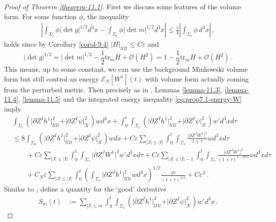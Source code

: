 \documentclass[11pt, a4paper]{amsart}
\numberwithin{equation}{section}
\numberwithin{theorem}{section}
\newcommand{\p}{\partial}
\newcommand{\pgood}{\overline{\partial}}
\newcommand{\tr}{\text{tr}}
\newcommand{\UU}{{\mathcal{U} \mathcal{U}}}
\newcommand{\K}{\mathcal{K}}
\newcommand{\I}{\vert I \vert}
\newcommand{\J}{\vert J \vert}
\begin{document}
\begin{proof}[Proof of Theorem \ref{theorem-11.1}]
First we discuss some features of the volume form. For some function $\phi$, the inequality
\begin{align*}
 \left\vert \int_{\Sigma_t} \phi \vert \det g \vert^{1/2} d^3 x -  \int_{\Sigma_t} \phi \vert \det m \vert^{1/2} d^3 x \right\vert \leq \frac{1}{4} \left\vert \int_{\Sigma_t} \phi \, d^3 x \right\vert \,,
\end{align*}
holds since by Corollary \ref{corol-9.4} $\vert H \vert_\UU \leq C \varepsilon $ and 
$$\vert \det  g \vert^{1/2} = \vert \det  m \vert^{1/2} - \frac{1}{2}\tr_{m} H + \mathcal{O}(H^2)=1- \frac{1}{2}\tr_{m} H + \mathcal{O}(H^2) \,.$$
This means, up to some constant, we can use the background Minkowski volume form but still control an energy $\mathcal{E}_N[W^1](t)$ with volume form actually coming from the perturbed metric. 
Then precisely as in \cite{LR:04}, Lemmas \ref{lemma-11.3}, \ref{lemma-11.4}, \ref{lemma-11.5} and the integrated energy inequality \eqref{eq:prop7.1-energy-W} imply
\begin{equation} \begin{split}
& \int_{\Sigma_t }  \left(  \vert \p Z^I h^1 \vert^2_\UU + \vert  \p Z^I \psi \vert^2_\K \right) w d^3x  + \int_0^t \int_{\Sigma_\tau} \left( \vert \pgood Z^I h^1 \vert^2_\UU + \vert \pgood Z^I \psi \vert^2_\K \right) w' d^3 x d \tau \\
&  \leq 8  \int_{\Sigma_0} \left( \vert \p Z^I h^1 \vert^2_\UU + \vert \p Z^I \psi \vert^2_\K \right) w dx + C \varepsilon \sum_{\J \leq \I} \int_0^t \int_{\Sigma_\tau} \frac{\vert \p Z^J W^1 \vert^2}{1+ \tau} w d^3x d\tau \\
& \qquad + C \varepsilon \sum_{\J \leq \I} \int_0^t \int_{\Sigma_\tau} \vert \pgood Z^J W^1 \vert^2 w' d^3x d\tau  + C \varepsilon \sum_{\J \leq \I -1} \int_0^t \int_{\Sigma_\tau} \frac{\vert \p Z^J W^1 \vert^2}{(1+\tau)^{1-2C\varepsilon}} w d^3 x d \tau \\
& \qquad + C_N \varepsilon \sum_{\J \leq \I} \int_0^t \left( \int_{\Sigma_\tau} \vert \p Z^J h^1 \vert^2_\UU w d^3 x \right)^{1/2} \frac{d \tau}{(1+\tau)^{3/2}} + C \varepsilon^3 \,.
\end{split} \end{equation}
Similar to \cite{LR:04}, define a quantity for the `good' derivative
\begin{align*} 
S_m(t) &:= \sum_{\vert I \vert \leq m} \int_0^t \int_{\Sigma_\tau} \left( \vert \pgood Z^I h^1 \vert_\UU^2 +  \vert \pgood Z^I \psi \vert^2_\K \right) w' d^3x \,.

\end{align*}
\end{proof}
\end{document}
